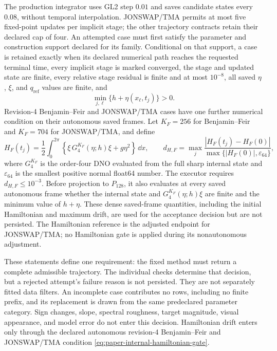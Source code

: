 The production integrator uses GL2 step \(0.01\) and saves candidate states
every \(0.08\), without temporal interpolation.  JONSWAP/TMA permits at most
five fixed-point updates per implicit stage; the other trajectory contracts
retain their declared cap of four.  An attempted case must first
satisfy the parameter and construction support declared for its family.
Conditional on that support, a case is retained exactly when its declared
numerical path reaches the requested terminal time, every implicit stage is
marked converged, the stage and updated state are finite, every relative stage
residual is finite and at most \(10^{-8}\), all saved \(\eta\), \(\xi\), and
\(q_{\mathrm{ref}}\) values are finite, and
\[
  \min_{j,\ell}\{h+\eta(x_\ell,t_j)\}>0.
\]
Revision-4 Benjamin--Feir and JONSWAP/TMA cases have one further numerical
condition on their autonomous saved frames.  Let \(K_F=256\) for
Benjamin--Feir and \(K_F=704\) for JONSWAP/TMA, and define
\begin{equation}
  H_F(t_j)
  =\frac12\int_0^{2\pi}
    \left\{\xi\,G^{K_F}_4(\eta;h)\xi+g\eta^2\right\}\,\dd x,
  \qquad
  d_{H,F}
  =\max_j\frac{|H_F(t_j)-H_F(0)|}
                   {\max\{|H_F(0)|,\varepsilon_{64}\}},
  \label{eq:paper-internal-hamiltonian-gate}
\end{equation}
where \(G^{K_F}_4\) is the order-four DNO evaluated from the full sharp
internal state and \(\varepsilon_{64}\) is the smallest positive normal
float64 number.  The executor requires \(d_{H,F}\leq10^{-3}\).  Before
projection to \(P_{128}\), it also evaluates at every saved autonomous frame
whether the internal state and \(G^{K_F}_4(\eta;h)\xi\) are finite and the
minimum value of \(h+\eta\).  These dense saved-frame quantities, including
the initial Hamiltonian and maximum drift, are used for the acceptance
decision but are not persisted.
The Hamiltonian reference is the adjusted endpoint for JONSWAP/TMA; no
Hamiltonian gate is applied during its nonautonomous adjustment.

These statements define one requirement: the fixed method must return a
complete admissible trajectory.  The individual checks determine that
decision, but a rejected attempt's failure reason is not persisted.  They are
not separately fitted data filters.  An
incomplete case contributes no rows, including no finite prefix, and its
replacement is drawn from the same predeclared parameter category.  Sign
changes, slope, spectral roughness, target magnitude, visual appearance, and
model error do not enter this decision.  Hamiltonian drift enters only through
the declared autonomous revision-4 Benjamin--Feir and JONSWAP/TMA condition
\cref{eq:paper-internal-hamiltonian-gate}.

